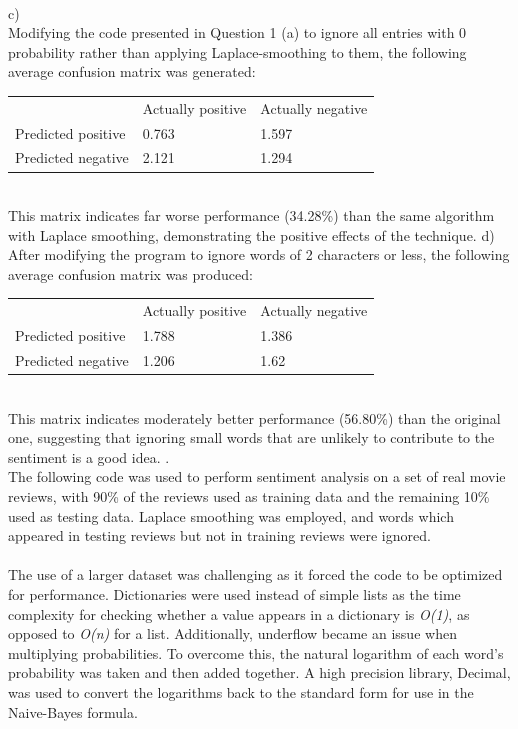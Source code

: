 \documentclass[10pt]{article}
\begin{document}
\\
c)\\
Modifying the code presented in Question 1 (a) to ignore all entries with 0 probability rather than applying Laplace-smoothing to them, the following average confusion matrix was generated:
\begin{table}[h]
\centering
\begin{tabular}{lll}
                   & Actually positive & Actually negative \\
Predicted positive & 0.763             & 1.597 \\
Predicted negative & 2.121             & 1.294            
\end{tabular}
\end{table}\\
This matrix indicates far worse performance (34.28\%) than the same algorithm with Laplace smoothing, demonstrating the positive effects of the technique.
\newpage
d)\\After modifying the program to ignore words of 2 characters or less, the following average confusion matrix was produced:
\begin{table}[h]
\begin{tabular}{lll}
                   & Actually positive & Actually negative \\
Predicted positive & 1.788             & 1.386 \\
Predicted negative & 1.206             & 1.62            
\end{tabular}
\end{table}\\
This matrix indicates moderately better performance (56.80\%) than the original one, suggesting that ignoring small words that are unlikely to contribute to the sentiment is a good idea.
.\\
The following code was used to perform sentiment analysis on a set of real movie reviews, with 90\% of the reviews used as training data and the remaining 10\% used as testing data. Laplace smoothing was employed, and words which appeared in testing reviews but not in training reviews were ignored.\\ 
\\
The use of a larger dataset was challenging as it forced the code to be optimized for performance. Dictionaries were used instead of simple lists as the time complexity for checking whether a value appears in a dictionary is \textit{O(1)}, as opposed to \textit{O(n)} for a list. Additionally, underflow became an issue when multiplying probabilities. To overcome this, the natural logarithm of each word's probability was taken and then added together. A high precision library, Decimal, was used to convert the logarithms back to the standard form for use in the Naive-Bayes formula.  
\end{document}
